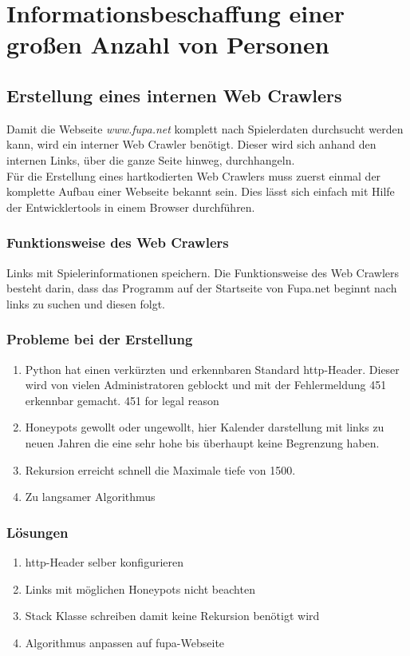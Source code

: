 \section{Informationsbeschaffung einer großen Anzahl von Personen}
\label{sec:} %
	\subsection{Erstellung eines internen Web Crawlers} %
	\label{sse:}
	Damit die Webseite \textit{www.fupa.net} komplett nach Spielerdaten durchsucht werden kann, wird ein interner Web Crawler benötigt. Dieser wird sich anhand den internen Links, über die ganze Seite hinweg, durchhangeln.\\
	Für die Erstellung eines hartkodierten Web Crawlers muss zuerst einmal der komplette Aufbau einer Webseite bekannt sein. Dies lässt sich einfach mit Hilfe der Entwicklertools in einem Browser durchführen. %
	
	\subsubsection{Funktionsweise des Web Crawlers}
	Links mit Spielerinformationen speichern.
	Die Funktionsweise des Web Crawlers besteht darin, dass das Programm auf der Startseite von Fupa.net beginnt nach links zu suchen und diesen folgt.
	\subsubsection{Probleme bei der Erstellung} %
	\begin{enumerate}
		\item Python hat einen verkürzten und erkennbaren Standard http-Header. Dieser wird von vielen Administratoren geblockt und mit der Fehlermeldung 451 erkennbar gemacht. 451 for legal reason
		\item Honeypots gewollt oder ungewollt, hier Kalender darstellung mit links zu neuen Jahren die eine sehr hohe bis überhaupt keine Begrenzung haben.
		\item Rekursion erreicht schnell die Maximale tiefe von 1500.
		\item Zu langsamer Algorithmus
	\end{enumerate}
	
	
	\subsubsection{Lösungen}
	\begin{enumerate}
		\item http-Header selber konfigurieren
		\item Links mit möglichen Honeypots nicht beachten
		\item Stack Klasse schreiben damit keine Rekursion benötigt wird
		\item Algorithmus anpassen auf fupa-Webseite
	\end{enumerate}
	
